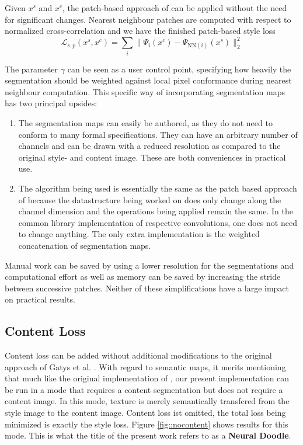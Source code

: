 Given \(x^s\) and \(x^c\), the patch-based approach of \cite{mrf2016} can be applied without the need for significant changes. Nearest neighbour patches are computed with respect to normalized cross-correlation and we have the finished patch-based style loss
\[\mathcal{L}_{s,p}(x^s,x^c) = \sum_i \|\Psi_i(x^c)-\Psi_{\text{NN}(i)}(x^s)\|_2^2\]

The parameter \(\gamma\) can be seen as a user control point, specifying how heavily the segmentation should be weighted against local pixel conformance during nearest neighbour computation. This specific way of incorporating segmentation maps has two principal upsides:
\begin{enumerate}
	\item The segmentation maps can easily be authored, as they do not need to conform to many formal specifications. They can have an arbitrary number of channels and can be drawn with a reduced resolution as compared to the original style- and content image. These are both conveniences in practical use.
	\item The algorithm being used is essentially the same as the patch based approach of \cite{mrf2016} because the datastructure being worked on does only change along the channel dimension and the operations being applied remain the same. In the common library implementation of respective convolutions, one does not need to change anything. The only extra implementation is the weighted concatenation of segmentation maps.
\end{enumerate}

Manual work can be saved by using a lower resolution for the segmentations and computational effort as well as memory can be saved by increasing the stride between successive patches. Neither of these simplifications have a large impact on practical results.

\subsection{Content Loss}

Content loss can be added without additional modifications to the original approach of Gatys et al. \cite{gatys2015neural}. With regard to semantic maps, it merits mentioning that much like the original implementation of \cite{doodles2016}, our present implementation can be run in a mode that requires a content segmentation but does not require a content image. In this mode, texture is merely semantically transfered from the style image to the content image. Content loss ist omitted, the total loss being minimized is exactly the style loss. Figure \ref{fig::nocontent} shows results for this mode. This is what the title of the present work refers to as a \textbf{Neural Doodle}.

